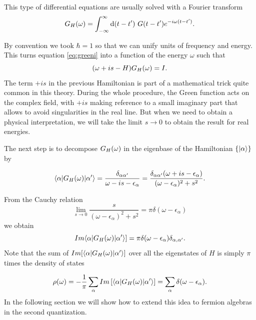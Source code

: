 \noindent This type of differential equations are usually solved with a Fourier transform 
\begin{equation}
    \Green{H}=\int_{-\infty}^{\infty}\text{d}(t-t')\ G(t-t')e^{-i\omega(t-t')}.
\end{equation}

\noindent By convention we took  $\hbar =1$ so that we can unify units of frequency and energy. This turns equation \eqref{eq:greeni} into a function of the energy $\omega$ such that 
\begin{equation} 
(\omega+is -H)G_{H}(\omega)=I. 
\end{equation}
\noindent The term $+is$ in the previous Hamiltonian is part of a mathematical trick quite common in this theory. During the whole procedure, the Green function acts on the complex field, with $+is$   making reference to a small imaginary part that allows to avoid singularities in the real line. But when we need to obtain a physical interpretation, we will take the limit $s\rightarrow0$ to obtain the result for real energies. 

The next step is to decompose $G_{H}(\omega)$ in the eigenbase of the Hamiltonian $\{\vert \alpha \rangle\}$  by 


\begin{equation}
    \langle \alpha  \vert G_{H}(\omega)\vert \alpha' \rangle=\frac{\delta_{\alpha\alpha'}}{\omega - is -\epsilon_\alpha}=\frac{\delta_{\alpha\alpha'}(\omega + is -\epsilon_\alpha)}{(\omega-\epsilon_{\alpha})^{2}+s^{2}}.
\end{equation}

From the Cauchy relation            
\begin{equation}
\lim_{s\rightarrow0}\frac{s}{(\omega-\epsilon_{\alpha})^{2}+s^{2}}=\pi\delta(\omega-\epsilon_{\alpha})
\end{equation}
we obtain 
\begin{equation}
    Im \langle \alpha  \vert G_{H}(\omega)\vert \alpha' \rangle] = \pi \delta(\omega -\epsilon_\alpha)\delta_{\alpha,\alpha'}.
\end{equation}
Note that the sum of $Im[ \langle \alpha  \vert G_{H}(\omega)\vert \alpha' \rangle]$ over all the eigenstates of $H$ is simply $\pi$ times the density of states

\begin{equation}
    \rho(\omega)=-\frac{1}{\pi} \sum_\alpha Im \left[ \langle \alpha  \vert G_{H}(\omega)\vert \alpha' \rangle\right] = \sum_\alpha \delta(\omega-\epsilon_\alpha) . \label{eq:DOS_def}
\end{equation}
In the following section we will show how to extend this idea to fermion algebras in the second  quantization.  

